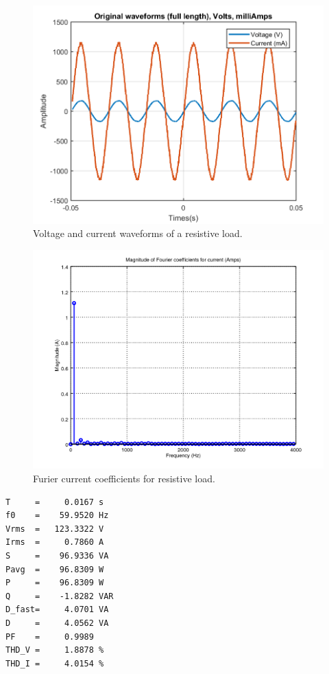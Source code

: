 \documentclass[journal]{IEEEtran}
\begin{document}
\begin{figure}[h]
\centering
\includegraphics[clip,width=\columnwidth]{original_waveform_cautin.png}
\caption{Voltage and current waveforms of a resistive load.}
\label{original_resistive_load}
\end{figure}

\begin{figure}[h]
\centering
\includegraphics[clip,width=\columnwidth]{zoomed_current_furier_coefficients_resistive.png}
\caption{Furier current coefficients for resistive load.}
\label{fourier_corrent_coefficients_resistive}
\end{figure}

\begin{lstlisting}
T     =     0.0167 s 
f0    =    59.9520 Hz 
Vrms  =   123.3322 V
Irms  =     0.7860 A
S     =    96.9336 VA
Pavg  =    96.8309 W 
P     =    96.8309 W 
Q     =    -1.8282 VAR 
D_fast=     4.0701 VA 
D     =     4.0562 VA 
PF    =     0.9989 
THD_V =     1.8878 %
THD_I =     4.0154 %
\end{lstlisting}
\end{document}
